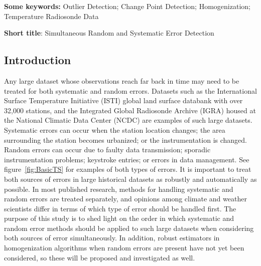 \documentclass[12pt]{article}
\begin{document}
\begin{singlespacing}
\par\vfill\noindent
{\bf Some keywords:} Outlier Detection; Change Point Detection; Homogenization; Temperature Radiosonde Data

\par\medskip\noindent
{\bf Short title}:  Simultaneous Random and Systematic Error Detection

\end{singlespacing}
\clearpage\pagebreak\newpage {}
\begin{doublespacing}


\section{Introduction}

Any large dataset whose observations reach far back in time may need to be treated for both systematic and random errors. Datasets such as the International Surface Temperature Initiative (ISTI) global land surface databank \cite{rennie14} with over 32,000 stations, and the Integrated Global Radiosonde Archive (IGRA) housed at the National Climatic Data Center (NCDC) \cite{durre06} are examples of such large datasets. Systematic errors can occur when the station location changes; the area surrounding the station becomes urbanized; or the instrumentation is changed. Random errors can occur due to faulty data transmission; sporadic instrumentation problems; keystroke entries; or errors in data management. See figure~\ref{fig:BasicTS} for examples of both types of errors.  It is important to treat both sources of errors in large historical datasets as robustly and automatically as possible. In most published research, methods for handling systematic and random errors are treated separately, and opinions among climate and weather scientists differ in terms of which type of error should be handled first. The purpose of this study is to shed light on the order in which systematic and random error methods should be applied to such large datasets when considering both sources of error simultaneously. In addition, robust estimators in homogenization algorithms when random errors are present have not yet been considered, so these will be proposed and investigated as well.


\end{doublespacing}
\end{document}

